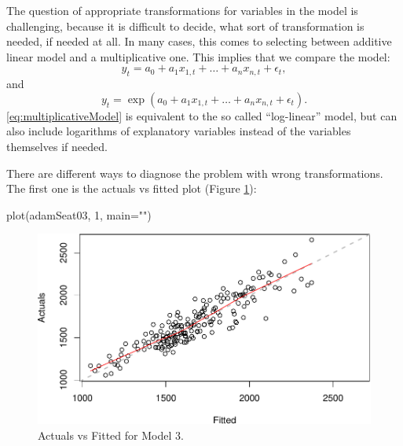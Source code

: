 \documentclass[
]{book}
\newenvironment{Shaded}{\begin{snugshade}}{\end{snugshade}}
\newcommand{\AttributeTok}[1]{\textcolor[rgb]{0.77,0.63,0.00}{#1}}
\newcommand{\DecValTok}[1]{\textcolor[rgb]{0.00,0.00,0.81}{#1}}
\newcommand{\FunctionTok}[1]{\textcolor[rgb]{0.00,0.00,0.00}{#1}}
\newcommand{\NormalTok}[1]{#1}
\newcommand{\StringTok}[1]{\textcolor[rgb]{0.31,0.60,0.02}{#1}}
\theoremstyle{definition}
\theoremstyle{definition}
\theoremstyle{definition}
\theoremstyle{definition}
\theoremstyle{remark}
\begin{document}
The question of appropriate transformations for variables in the model is challenging, because it is difficult to decide, what sort of transformation is needed, if needed at all. In many cases, this comes to selecting between additive linear model and a multiplicative one. This implies that we compare the model:
\begin{equation}
    y_t = a_0 + a_1 x_{1,t} + \dots + a_n x_{n,t} + \epsilon_t,
    \label{eq:additiveModel}
\end{equation}
and
\begin{equation}
    y_t = \exp\left(a_0 + a_1 x_{1,t} + \dots + a_n x_{n,t} + \epsilon_t\right) .
    \label{eq:multiplicativeModel}
\end{equation}
\eqref{eq:multiplicativeModel} is equivalent to the so called ``log-linear'' model, but can also include logarithms of explanatory variables instead of the variables themselves if needed.

There are different ways to diagnose the problem with wrong transformations. The first one is the actuals vs fitted plot (Figure \ref{fig:adamSeat03ActualsFitted}):

\begin{Shaded}
\begin{Highlighting}[]
\FunctionTok{plot}\NormalTok{(adamSeat03, }\DecValTok{1}\NormalTok{, }\AttributeTok{main=}\StringTok{""}\NormalTok{)}
\end{Highlighting}
\end{Shaded}

\begin{figure}
\centering
\includegraphics{Svetunkov--2022----ADAM_files/figure-latex/adamSeat03ActualsFitted-1.pdf}
\caption{\label{fig:adamSeat03ActualsFitted}Actuals vs Fitted for Model 3.}
\end{figure}
\end{document}
